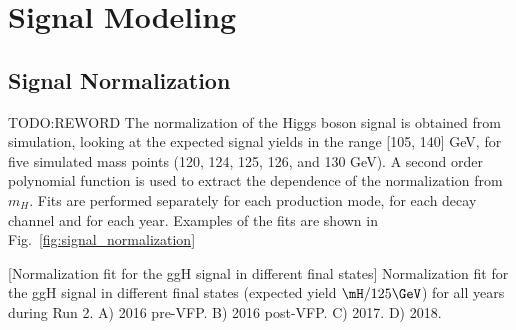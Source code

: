\section{Signal Modeling}
\label{sec:signal_model}

\subsection{Signal Normalization}
\label{sec:SignalNormalization}
TODO:REWORD The normalization of the Higgs boson signal is obtained from simulation, 
looking at the expected signal yields in the range [105, 140] GeV, 
for five simulated mass points (120, 124, 125, 126, and 130 GeV).
A second order polynomial function is used to extract the dependence of the normalization from $m_{H}$.
Fits are performed separately for each production mode, for each decay channel and for each year. 
Examples of the fits are shown in Fig.~\ref{fig:signal_normalization}
\begin{multiFigure}
    \centering
        [Normalization fit for the ggH signal in different final states]
        {Normalization fit for the ggH signal in different final states (expected yield \vs $\mH / 125\GeV$) for all years during Run 2.
        \;A) 2016 pre-VFP.
        \;B) 2016 post-VFP.
        \;C) 2017.
        \;D) 2018.
        }
    \label{fig:signal_normalization}
\end{multiFigure}
%
